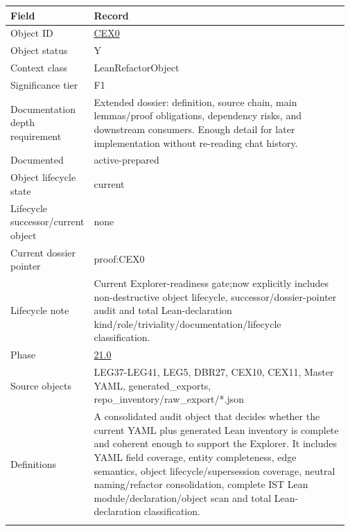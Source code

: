 \begin{longtable}{L{0.16\linewidth} L{0.81\linewidth}}
\hline
\textbf{Field} & \textbf{Record}\\
\hline
Object ID & \hyperlink{object-row-CEX0}{CEX0}\\
\hline\addlinespace[0.20em]
Object status & Y\\
\hline\addlinespace[0.20em]
Context class & LeanRefactorObject\\
\hline\addlinespace[0.20em]
Significance tier & F1\\
\hline\addlinespace[0.20em]
Documentation depth requirement & Extended dossier: definition, source chain, main lemmas/\allowbreak{}proof obligations, dependency risks, and downstream consumers. Enough detail for later implementation without re-reading chat history.\\
\hline\addlinespace[0.20em]
Documented & active-prepared\\
\hline\addlinespace[0.20em]
Object lifecycle state & current\\
\hline\addlinespace[0.20em]
Lifecycle successor/\allowbreak{}current object & none\\
\hline\addlinespace[0.20em]
Current dossier pointer & proof:CEX0\\
\hline\addlinespace[0.20em]
Lifecycle note & Current Explorer-readiness gate;\newline now explicitly includes non-destructive object lifecycle, successor/\allowbreak{}dossier-pointer audit and total Lean-declaration kind/\allowbreak{}role/\allowbreak{}triviality/\allowbreak{}documentation/\allowbreak{}lifecycle classification.\\
\hline\addlinespace[0.20em]
Phase & \hyperlink{phase-row-21-0}{21.0}\\
\hline\addlinespace[0.20em]
Source objects & LEG37-LEG41, LEG5, DBR27, CEX10, CEX11, Master YAML, generated\_exports, repo\_inventory/\allowbreak{}raw\_export/\allowbreak{}*.json\\
\hline\addlinespace[0.20em]
Definitions & A consolidated audit object that decides whether the current YAML plus generated Lean inventory is complete and coherent enough to support the Explorer. It includes YAML field coverage, entity completeness, edge semantics, object lifecycle/\allowbreak{}supersession coverage, neutral naming/\allowbreak{}refactor consolidation, complete IST Lean module/\allowbreak{}declaration/\allowbreak{}object scan and total Lean-declaration classification.\\
\hline\addlinespace[0.20em]

\end{longtable}
